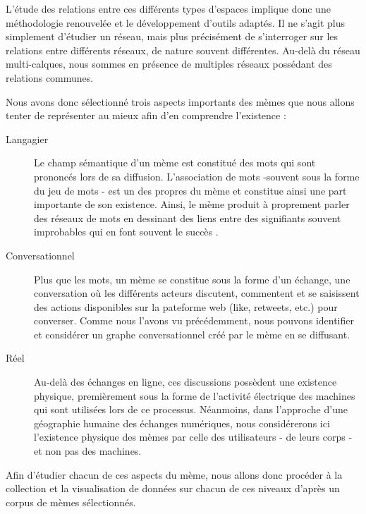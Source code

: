 L{\textquoteright}étude des relations entre ces différents types d{\textquoteright}espaces implique donc une méthodologie renouvelée et le développement d{\textquoteright}outils adaptés. Il ne s{\textquoteright}agit plus simplement d{\textquoteright}étudier un réseau, mais plus précisément de s{\textquoteright}interroger sur les relations entre différents réseaux, de nature souvent différentes. Au-delà du réseau multi-calques, nous sommes en présence de multiples réseaux possédant des relations communes. 

Nous avons donc sélectionné trois aspects importants des mèmes que nous allons tenter de représenter au mieux afin d{\textquoteright}en comprendre l{\textquoteright}existence :

\begin{description}
    \item[Langagier] Le champ sémantique d{\textquoteright}un mème est constitué des mots qui sont prononcés lors de sa diffusion. L{\textquoteright}association de mots -souvent sous la forme du jeu de mots - est un des propres du mème et constitue ainsi une part importante de son existence. Ainsi, le mème produit à proprement parler des réseaux de mots en dessinant des liens entre des signifiants souvent improbables qui en font souvent le succès \citep{Bauckhage2011}. 

    \item[Conversationnel] Plus que les mots, un mème se constitue sous la forme d{\textquoteright}un échange, une conversation o\`u les différents acteurs discutent, commentent et se saisissent des actions disponibles sur la pateforme web (like, retweets, etc.) pour converser. Comme nous l{\textquoteright}avons vu précédemment, nous pouvons identifier et considérer un graphe conversationnel créé par le mème en se diffusant. 

    \item[Réel] Au-delà des échanges en ligne, ces discussions possèdent une existence physique, premièrement sous la forme de l{\textquoteright}activité électrique des machines qui sont utilisées lors de ce processus. Néanmoins, dans l{\textquoteright}approche d{\textquoteright}une géographie humaine des échanges numériques, nous considérerons ici l{\textquoteright}existence physique des mèmes par celle des utilisateurs - de leurs corps - et non pas des machines. 
\end{description}


Afin d{\textquoteright}étudier chacun de ces aspects du mème, nous allons donc procéder à la collection et la visualisation de données sur chacun de ces niveaux d{\textquoteright}après un corpus de mèmes sélectionnés. 


